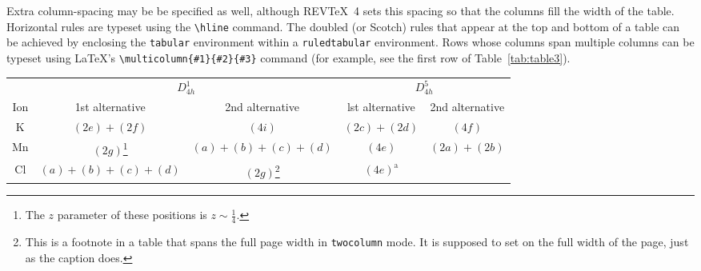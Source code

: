 \documentclass[%
 aapm,
 mph,%
 amsmath,amssymb,
preprint,%
 reprint,%
]{revtex4-2}
\begin{document}
Extra column-spacing may be be specified as well, although
REV\TeX~4 sets this spacing so that the columns fill the width of the
table.
Horizontal rules are typeset using the \verb+\hline+
command.
The doubled (or Scotch) rules that appear at the top and
bottom of a table can be achieved by enclosing the \texttt{tabular}
environment within a \texttt{ruledtabular} environment.
Rows whose columns span multiple columns can be typeset using \LaTeX's
\verb+\multicolumn{#1}{#2}{#3}+ command
(for example, see the first row of Table~\ref{tab:table3}).%
\begin{table*}
  \caption{\label{tab:table3}This is a wide table that spans the page
    width in \texttt{twocolumn} mode. It is formatted using the
    \texttt{table*} environment. It also demonstrates the use of
    \textbackslash\texttt{multicolumn} in rows with entries that span
    more than one column.}
  \begin{ruledtabular}
    \begin{tabular}{ccccc}
          & \multicolumn{2}{c}{$D_{4h}^1$}                                               & \multicolumn{2}{c}{$D_{4h}^5$}                                                                                 \\
      Ion & 1st alternative                                                              & 2nd alternative                                                        & lst alternative
          & 2nd alternative                                                                                                                                                                               \\ \hline
      K   & $(2e)+(2f)$                                                                  & $(4i)$                                                                 & $(2c)+(2d)$       & $(4f)$            \\
      Mn  & $(2g)$\footnote{The $z$ parameter of these positions is $z\sim\frac{1}{4}$.}
          & $(a)+(b)+(c)+(d)$                                                            & $(4e)$                                                                 & $(2a)+(2b)$                           \\
      Cl  & $(a)+(b)+(c)+(d)$                                                            & $(2g)$\footnote{This is a footnote in a table that spans the full page
        width in \texttt{twocolumn} mode. It is supposed to set on the full width of the page, just as the caption does. }
          & $(4e)^{\text{a}}$                                                                                                                                                                             \\

\end{tabular}
\end{ruledtabular}
\end{table*}
\end{document}
